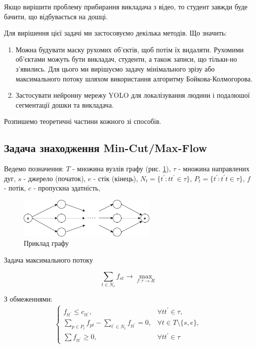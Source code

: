 Якщо вирішити проблему прибирання викладача з відео, то студент завжди 
буде бачити, що відбувається на дошці.

Для вирішення цієї задачі ми застосовуємо декілька методів.
Що значить:
\begin{enumerate}
    \item Можна будувати маску рухомих об'єктів,
          щоб потім їх видаляти. Рухомими об'єктами можуть бути викладач, 
          студенти, а також записи, що тільки-но з'явились.
          Для цього ми вирішуємо задачу мінімального зрізу або максимального потоку
          шляхом використання алгоритму Бойкова-Колмогорова.
    \item Застосувати нейронну мережу YOLO для локалізування людини
          і подалюшої сегментації дошки та викладача.
\end{enumerate}

Розпишемо теоретичні частини кожного зі способів.

\subsection{Задача знаходження Min-Cut/Max-Flow}

Ведемо позначення:
$T$ - множина вузлів графу (рис. \ref{fig:graph_example}), 
$\tau$ - множина направлених дуг,
$s$ - джерело (початок),
$e$ - стік (кінець),
$N_t = \{t^{'}: tt^{'} \in \tau \}$,
$P_t = \{t^{'}: t^{'}t \in \tau \}$,
$f$ - потік,
$c$ - пропускна здатність,

\begin{figure}[h]
    \centering
    \includegraphics[width=0.6\textwidth]{images/graph_example}
    \caption{Приклад графу}
    \label{fig:graph_example}
\end{figure}

Задача максимального потоку

\begin{equation}
    \sum_{t \in N_s} f_{st} \rightarrow \max_{f: \tau \rightarrow R }
\end{equation}

З обмеженнями: 
\begin{equation} 
    \begin{gathered}
        \begin{cases}
            f_{tt^{'}} \leq  c_{tt^{'}}, &  \forall tt^{'}  \in \tau , \\

            \sum_{p \in P_t} f_{pt} - \sum_{t^{'} \in N_t} f_{tt^{'}} = 0, & 
            \forall t \in T \setminus \{s,e\}, \\

            \sum f_{tt^{'}} \geq 0, & \forall tt^{'}  \in \tau
        \end{cases}
\end{gathered}
\end{equation}

